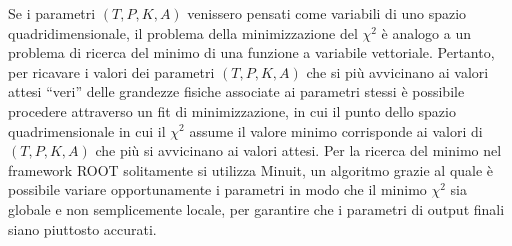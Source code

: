 \documentclass[12pt,a4paper,twoside]{report}
\begin{document}
\begin{appendices}
\begin{equation}
		\end{equation}
		Se i parametri $\left(T,P,K,A\right)$ venissero pensati come variabili di uno spazio quadridimensionale, il problema della minimizzazione del $\chi^2$ è analogo a un problema di ricerca del minimo di una funzione a variabile vettoriale. Pertanto, per ricavare i valori dei parametri $\left(T,P,K,A\right)$ che si più avvicinano ai valori attesi ``veri'' delle grandezze fisiche associate ai parametri stessi è possibile procedere attraverso un fit di minimizzazione, in cui il punto dello spazio quadrimensionale in cui il $\chi^2$ assume il valore minimo corrisponde ai valori di $\left(T,P,K,A\right)$ che più si avvicinano ai valori attesi. Per la ricerca del minimo nel framework ROOT solitamente si utilizza Minuit, un algoritmo grazie al quale è possibile variare opportunamente i parametri in modo che il minimo $\chi^2$ sia globale e non semplicemente locale, per garantire che i parametri di output finali siano piuttosto accurati.
		

\end{appendices}
\end{document}
